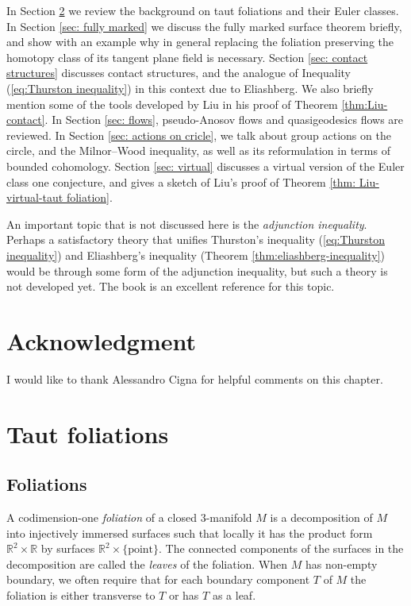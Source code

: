 \documentclass[11pt]{amsart}
\theoremstyle{remark}
\theoremstyle{definition}
\begin{document}
	In Section \ref{sec: taut foliations} we review the background on taut foliations and their Euler classes. In Section \ref{sec: fully marked} we discuss the fully marked surface theorem briefly, and show with an example why in general replacing the foliation preserving the homotopy class of its tangent plane field is necessary. Section \ref{sec: contact structures} discusses contact structures, and the analogue of Inequality (\ref{eq:Thurston inequality}) in this context due to Eliashberg. We also briefly mention some of the tools developed by Liu in his proof of Theorem \ref{thm:Liu-contact}.  In Section \ref{sec: flows}, pseudo-Anosov flows and quasigeodesics flows are reviewed. In Section \ref{sec: actions on cricle}, we talk about group actions on the circle, and the Milnor--Wood inequality, as well as its reformulation in terms of bounded cohomology. Section \ref{sec: virtual} discusses a virtual version of the Euler class one conjecture, and gives a sketch of Liu's proof of Theorem \ref{thm: Liu-virtual-taut foliation}. 
	
	An important topic that is not discussed here is the \emph{adjunction inequality}. Perhaps a satisfactory theory that unifies Thurston's inequality (\ref{eq:Thurston inequality}) and Eliashberg's inequality (Theorem \ref{thm:eliashberg-inequality}) would be through some form of the adjunction inequality, but such a theory is not developed yet. The book \cite{ozbagci-stipsicz} is an excellent reference for this topic. 
	
	\section{Acknowledgment} I would like to thank Alessandro Cigna for helpful comments on this chapter. 
	
	\section{Taut foliations}
	\label{sec: taut foliations}
	
	\subsection{Foliations}
	A codimension-one \emph{foliation} of a closed 3-manifold $M$ is a decomposition of $M$ into injectively immersed surfaces such that locally it has the product form $\mathbb{R}^2 \times \mathbb{R}$ by surfaces $\mathbb{R}^2 \times \{ \text{point}\}$. The connected components of the surfaces in the decomposition are called the \emph{leaves} of the foliation. When $M$ has non-empty boundary, we often require that for each boundary component $T$ of $M$ the foliation is either transverse to $T$ or has $T$ as a leaf. 
	
\end{document}

